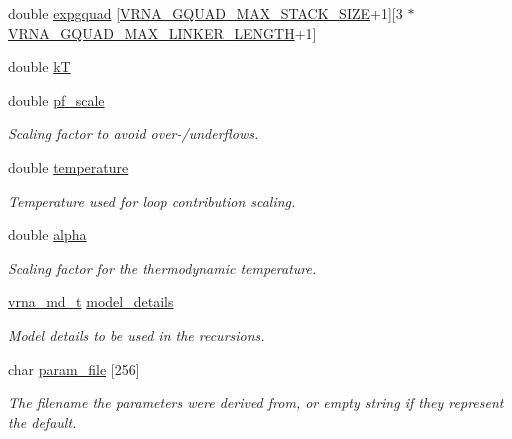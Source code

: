 \begin{DoxyCompactItemize}
double \mbox{\hyperlink{group__energy__parameters_a8a230c75cd0fae888aedd45f488b4ff7}{expgquad}} \mbox{[}\mbox{\hyperlink{group__energy__parameters_gab7b5159125a90babbd3b81319305f35f}{V\+R\+N\+A\+\_\+\+G\+Q\+U\+A\+D\+\_\+\+M\+A\+X\+\_\+\+S\+T\+A\+C\+K\+\_\+\+S\+I\+ZE}}+1\mbox{]}\mbox{[}3 $\ast$\mbox{\hyperlink{group__energy__parameters_gaabc251a60f6dbe927dd3a3881a161fb7}{V\+R\+N\+A\+\_\+\+G\+Q\+U\+A\+D\+\_\+\+M\+A\+X\+\_\+\+L\+I\+N\+K\+E\+R\+\_\+\+L\+E\+N\+G\+TH}}+1\mbox{]}
\item 
double \mbox{\hyperlink{group__energy__parameters_aee22f89eac71caf2bac24cc795de17aa}{kT}}
\item 
double \mbox{\hyperlink{group__energy__parameters_a53c12f0d74f94ce371e0471a8ab5a377}{pf\+\_\+scale}}
\begin{DoxyCompactList}\small\item\em Scaling factor to avoid over-\//underflows. \end{DoxyCompactList}\item 
double \mbox{\hyperlink{group__energy__parameters_a674656d65ea957ddbeff8bd146b7fc16}{temperature}}
\begin{DoxyCompactList}\small\item\em Temperature used for loop contribution scaling. \end{DoxyCompactList}\item 
double \mbox{\hyperlink{group__energy__parameters_a77145830b7bb01b36c3217b363310ef0}{alpha}}
\begin{DoxyCompactList}\small\item\em Scaling factor for the thermodynamic temperature. \end{DoxyCompactList}\item 
\mbox{\hyperlink{group__model__details_ga1f8a10e12a0a1915f2a4eff0b28ea17c}{vrna\+\_\+md\+\_\+t}} \mbox{\hyperlink{group__energy__parameters_ac18055127bccc27c1223f1d2f3b01b53}{model\+\_\+details}}
\begin{DoxyCompactList}\small\item\em Model details to be used in the recursions. \end{DoxyCompactList}\item 
char \mbox{\hyperlink{group__energy__parameters_a8e1b02a4753a9b64c3c9ae8529b9d75c}{param\+\_\+file}} \mbox{[}256\mbox{]}
\begin{DoxyCompactList}\small\item\em The filename the parameters were derived from, or empty string if they represent the default. \end{DoxyCompactList}\end{DoxyCompactItemize}


